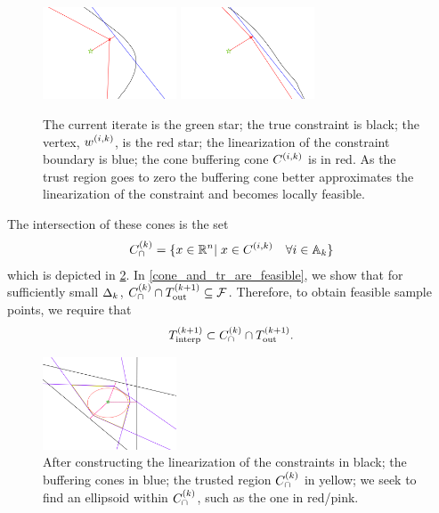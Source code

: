 \begin{figure}[ht]
    \centering
    \includegraphics[width=150px]{images/explanation_2.png}
    \includegraphics[width=150px]{images/explanation_3.png}
    \caption{
    	The current iterate is the green star;
    	the true constraint is black;
    	the vertex, ${w^{(i, k)}}$, is the red star;
    	the linearization of the constraint boundary is blue;
    	the cone buffering cone ${C^{(i, k)}}$ is in red.
    	As the trust region goes to zero the buffering cone better approximates the linearization of the constraint and becomes locally feasible.
	}
    \label{explanation_2}
\end{figure}
The intersection of these cones is the set
\begin{align}
{C^{(k)}_{\cap}} = \{x\in\mathbb R^n | \; x \in {C^{(i, k)}} \quad \forall i \in {\mathbb A_{k}} \} \label{define_capcones}
\end{align}
which is depicted in \cref{completed_2}.
In \cref{cone_and_tr_are_feasible}, we show that for sufficiently small $\Delta_k$, ${C^{(k)}_{\cap}} \cap {T_{\text{out}}^{(k+1)}} \subseteq {\mathcal F}$.
Therefore, to obtain feasible sample points, we require that 
\begin{align*}
{T_{\text{interp}}^{(k+1)}} \subset {C^{(k)}_{\cap}} \cap {T_{\text{out}}^{(k+1)}}.
\end{align*}


\begin{figure}[ht]
    \centering
    \includegraphics[width=150px]{images/completed_2.png}
    \caption{
    	After constructing 
    	the linearization of the constraints in black;
    	the buffering cones in blue;
    	the trusted region ${C^{(k)}_{\cap}}$ in yellow;
    	we seek to find an ellipsoid within ${C^{(k)}_{\cap}}$, such as the one in red/pink.
	}
    \label{completed_2}
\end{figure}


